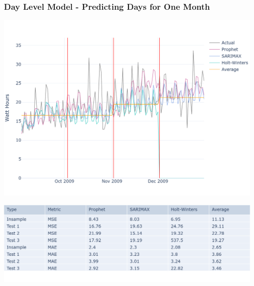 \documentclass[10pt]{beamer}
\begin{document}
\begin{frame}
\frametitle{Day Level Model - Predicting Days for One Month}

\bigskip
{
    \centering
    \includegraphics[width=\textwidth,height=\textheight,keepaspectratio]{model_comparison_timeseries_daymodel_days.png}
    \par
}
\bigskip

\bigskip
{
    \centering
    \includegraphics[width=\textwidth,height=\textheight,keepaspectratio]{model_comparison_table_daymodel_days.png}
    \par
}
\bigskip


\end{frame}
\end{document}
